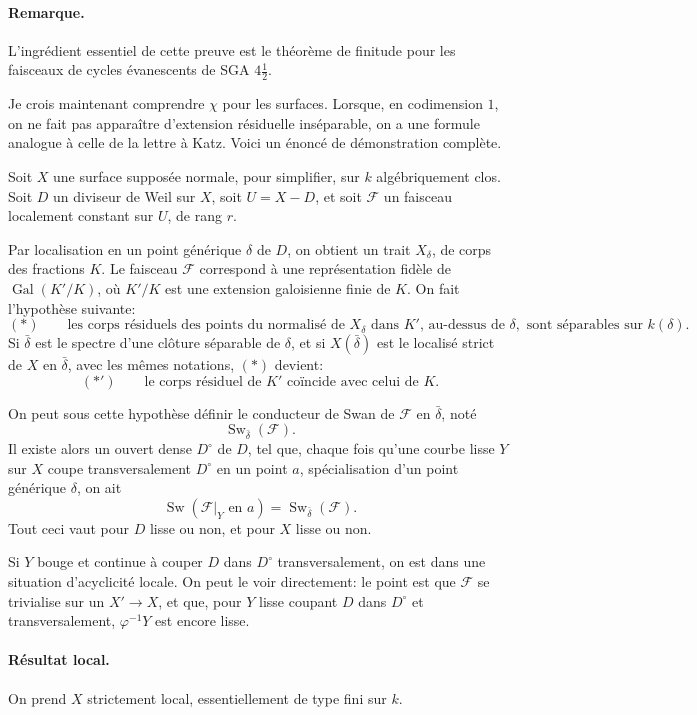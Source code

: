 \documentclass[11pt]{article}
\newcommand{\F}{\mathcal F}
\DeclareMathOperator{\Sw}{Sw}
\begin{document}
\paragraph{Remarque.}
L'ingrédient essentiel de cette preuve est le théorème de finitude pour les faisceaux de cycles évanescents de SGA \(4\frac12\).

Je crois maintenant comprendre \(\chi\) pour les surfaces. Lorsque, en codimension \(1\), on ne fait pas apparaître d'extension résiduelle inséparable, on a une formule analogue à celle de la lettre à Katz. Voici un énoncé de démonstration complète.

Soit \(X\) une surface supposée normale, pour simplifier, sur \(k\) algébriquement clos. Soit \(D\) un diviseur de Weil sur \(X\), soit \(U=X-D\), et soit \(\F\) un faisceau localement constant sur \(U\), de rang \(r\).

Par localisation en un point générique \(\delta\) de \(D\), on obtient un trait \(X_\delta\), de corps des fractions \(K\). Le faisceau \(\F\) correspond à une représentation fidèle de \(\operatorname{Gal}(K'/K)\), où \(K'/K\) est une extension galoisienne finie de \(K\). On fait l'hypothèse suivante:
\[
(*)\qquad
\text{les corps résiduels des points du normalisé de }X_\delta
\text{ dans }K'\text{, au-dessus de }\delta,\text{ sont séparables sur }k(\delta).
\]
Si \(\bar\delta\) est le spectre d'une clôture séparable de \(\delta\), et si \(X(\bar\delta)\) est le localisé strict de \(X\) en \(\bar\delta\), avec les mêmes notations, \((*)\) devient:
\[
(*')\qquad \text{le corps résiduel de }K'\text{ coïncide avec celui de }K.
\]

On peut sous cette hypothèse définir le conducteur de Swan de \(\F\) en \(\bar\delta\), noté
\[
  \Sw_{\bar\delta}(\F).
\]
Il existe alors un ouvert dense \(D^\circ\) de \(D\), tel que, chaque fois qu'une courbe lisse \(Y\) sur \(X\) coupe transversalement \(D^\circ\) en un point \(a\), spécialisation d'un point générique \(\delta\), on ait
\[
  \Sw(\F|_Y\text{ en }a)=\Sw_{\bar\delta}(\F).
\]
Tout ceci vaut pour \(D\) lisse ou non, et pour \(X\) lisse ou non.

Si \(Y\) bouge et continue à couper \(D\) dans \(D^\circ\) transversalement, on est dans une situation d'acyclicité locale. On peut le voir directement: le point est que \(\F\) se trivialise sur un \(X'\to X\), et que, pour \(Y\) lisse coupant \(D\) dans \(D^\circ\) et transversalement, \(\varphi^{-1}Y\) est encore lisse.

\paragraph{Résultat local.}
On prend \(X\) strictement local, essentiellement de type fini sur \(k\).
\end{document}
